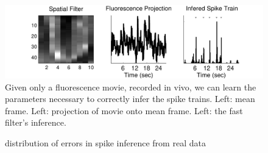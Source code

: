 
\begin{figure}[H]
\centering \includegraphics[width=.9\linewidth]{../figs/spatial_data}
\caption{Given only a fluorescence movie, recorded in vivo, we can learn the parameters necessary to correctly infer the spike trains. Left: mean frame.  Left: projection of movie onto mean frame. Left: the fast filter's inference.} \label{fig:spatial_data}
\end{figure}

\begin{figure}[H]
\caption{distribution of errors in spike inference from real data} \label{fig:err}
\end{figure}


